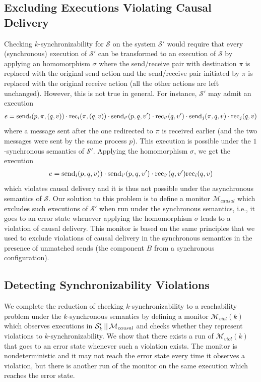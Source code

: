 \subsection{Excluding Executions Violating Causal Delivery}\label{ssec:verif3}

Checking $k$-synchronizability for $\mathcal{S}$ on the system $\mathcal{S'}$ would require that every (synchronous) execution of $\mathcal{S'}$ can be transformed to an execution of $\mathcal{S}$ by applying an homomorphism $\sigma$ where the send/receive pair with destination $\pi$ is replaced with the original send action and the send/receive pair initiated by $\pi$ is replaced with the original receive action (all the other actions are left unchanged). However, this is not true in general. For instance, $\mathcal{S'}$ may admit an execution 
\begin{align*}
e=\mathrm{send}_{i}({p,\pi,(q,v)})\cdot \mathrm{rec}_{i}({\pi,(q,v)})\cdot \mathrm{send}_{i'}({p,q,v'})\cdot \mathrm{rec}_{i'}({q,v'})\cdot \mathrm{send}_{j}({\pi,q,v})\cdot \mathrm{rec}_{j}({q,v})
\end{align*}
where a message sent after the one redirected to $\pi$ is received earlier (and the two messages were sent by the same process $p$). This execution is possible under the $1$-synchronous semantics of $\mathcal{S'}$. Applying the homomorphism $\sigma$, we get the execution 
\begin{align*}
e=\mathrm{send}_{i}({p,q,v)})\cdot \mathrm{send}_{i'}({p,q,v'})\cdot \mathrm{rec}_{i'}({q,v'})\mathrm{rec}_{i}({q,v})
\end{align*}
which violates causal delivery and it is thus not possible under the asynchronous semantics of $\mathcal{S}$.
Our solution to this problem is to define a monitor $\mathcal{M}_{\mathit{causal}}$ which excludes such executions of $\mathcal{S'}$ when run under the synchronous semantics, i.e., it goes to an error state whenever applying the homomorphism $\sigma$ leads to a violation of causal delivery. This monitor is based on the same principles that we used to exclude violations of causal delivery in the synchronous semantics in the presence of unmatched sends (the component $B$ from a synchronous configuration). 




\subsection{Detecting Synchronizability Violations}\label{ssec:verif4}

We complete the reduction of checking $k$-synchronizability to a reachability problem under the $k$-synchronous semantics by defining a monitor $\mathcal{M}_{\mathit{viol}}(k)$ which observes executions in $\mathcal{S}_k' \,||\,\mathcal{M}_{\mathit{causal}}$ and checks whether they represent violations to $k$-synchronizability. We show that there exists a run of $\mathcal{M}_{\mathit{viol}}(k)$ that goes to an error state whenever such a violation exists. The monitor is nondeterministic and it may not reach the error state every time it observes a violation, but there is another run of the monitor on the same execution which reaches the error state. 

